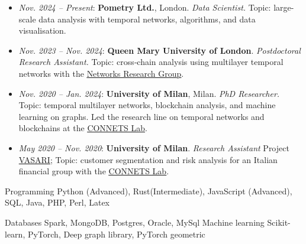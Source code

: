 \documentclass[11pt, a4paper]{awesome-cv}
\begin{document}
\begin{refsection}

\begin{itemize}
    \item \textit{Nov. 2024 – Present}: \textbf{Pometry Ltd.}, London. \textit{Data Scientist.}  
    Topic: large-scale data analysis with temporal networks, algorithms, and data visualisation.  

    \item \textit{Nov. 2023 – Nov. 2024}: \textbf{Queen Mary University of London}. \textit{Postdoctoral Research Assistant.}
    Topic: cross‑chain analysis using multilayer temporal networks with the \underline{\href{https://networks.eecs.qmul.ac.uk/}{Networks Research Group}}.

    \item \textit{Nov. 2020 – Jan. 2024}: \textbf{University of Milan}, Milan. \textit{PhD Researcher.}
    Topic: temporal multilayer networks, blockchain analysis, and machine learning on graphs. Led the research line on temporal networks and blockchains at the \underline{\href{https://connets.di.unimi.it/}{CONNETS Lab}}.

    \item \textit{May 2020 – Nov. 2020}: \textbf{University of Milan}. \textit{Research Assistant}  
    Project \href{https://www.vasariartexperience.it/}{VASARI}; Topic: customer segmentation and risk analysis for an Italian financial group with the \underline{\href{https://connets.di.unimi.it/}{CONNETS Lab}}.  
\end{itemize}




\begin{cvskills}
  \cvskill
    {Programming} %
    {Python (Advanced), Rust(Intermediate), JavaScript (Advanced), SQL, Java, PHP, Perl, Latex } %
    

  \cvskill
    {Databases} %
    {Spark, MongoDB, Postgres, Oracle, MySql} %
  \cvskill
    {Machine learning} %
    {Scikit-learn, PyTorch, Deep graph library, PyTorch geometric} %


\end{cvskills}
\end{refsection}
\end{document}
